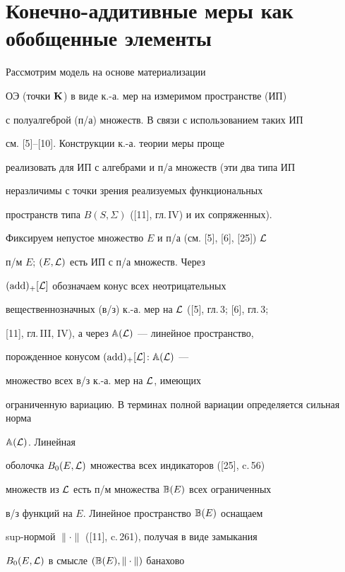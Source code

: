 \section{Конечно-аддитивные меры как обобщенные элементы}





Рассмотрим модель на основе материализации


ОЭ (точки ${\bold K}$) в виде к.-а. мер на измеримом пространстве (ИП)


с полуалгеброй (п/а) множеств. В связи с использованием таких ИП


см. [5]--[10]. Конструкции к.-а. теории меры проще


реализовать для ИП с алгебрами и п/а множеств (эти два типа ИП


неразличимы с точки зрения реализуемых функциональных


пространств типа $B(S,\Sigma)$ ([11], гл.\,IV) и их сопряженных).





Фиксируем непустое множество $E$ и п/а (см. [5], [6], [25]) ${\cal L}$


п/м $E$; $(E,{\cal L})$ есть ИП с п/а множеств. Через


${(\operatorname{add})_+}[{\cal L}]$ обозначаем конус всех неотрицательных


вещественнозначных (в/з) к.-а. мер на ${\cal L}$ ([5], гл.\,3; [6], гл.\,3;


[11], гл.\,III, IV), а через ${\Bbb A}({\cal L})$ --- линейное пространство,


порожденное конусом ${(\operatorname{add})_+}[{\cal L}]$: ${\Bbb A}({\cal L})$ ---


множество всех в/з к.-а. мер на ${\cal L}$, имеющих


ограниченную вариацию. В терминах полной вариации определяется сильная норма


${\Bbb A}({\cal L})$. Линейная 


оболочка ${B_0}(E,{\cal L})$ множества всех индикаторов ([25], c.\,56)


множеств из $\cal L$ есть п/м множества $\Bbb B(E)$ всех ограниченных


в/з функций на $E$. Линейное пространство ${\Bbb B}(E)$ оснащаем


sup-нормой $\|\cdot\|$ ([11], c.\,261), получая в виде замыкания


${B_0}(E,{\cal L})$ в смысле $({\Bbb B}(E),\|\cdot\|)$ банахово


